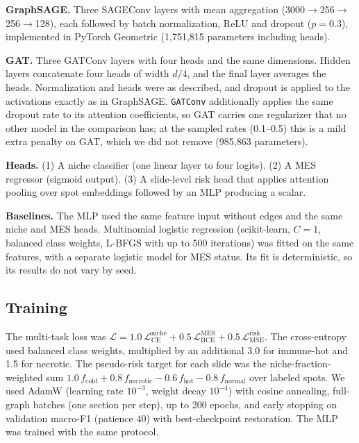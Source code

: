 \documentclass[11pt,letterpaper]{article}
\begin{document}
\textbf{GraphSAGE.} Three SAGEConv layers \cite{hamilton2017} with mean aggregation (3000$\rightarrow$256$\rightarrow$256$\rightarrow$128), each followed by batch normalization, ReLU and dropout ($p = 0.3$), implemented in PyTorch Geometric \cite{fey2019} (1{,}751{,}815 parameters including heads).

\textbf{GAT.} Three GATConv layers \cite{velickovic2018} with four heads and the same dimensions. Hidden layers concatenate four heads of width $d/4$, and the final layer averages the heads. Normalization and heads were as described, and dropout is applied to the activations exactly as in GraphSAGE. \texttt{GATConv} additionally applies the same dropout rate to its attention coefficients, so GAT carries one regularizer that no other model in the comparison has; at the sampled rates (0.1--0.5) this is a mild extra penalty on GAT, which we did not remove (985{,}863 parameters).

\textbf{Heads.} (1) A niche classifier (one linear layer to four logits). (2) A MES regressor (sigmoid output). (3) A slide-level risk head that applies attention pooling over spot embeddings followed by an MLP producing a scalar.

\textbf{Baselines.} The MLP used the same feature input without edges and the same niche and MES heads. Multinomial logistic regression (scikit-learn, $C = 1$, balanced class weights, L-BFGS with up to 500 iterations) was fitted on the same features, with a separate logistic model for MES status. Its fit is deterministic, so its results do not vary by seed.

\subsection{Training}

The multi-task loss was $\mathcal{L} = 1.0\,\mathcal{L}_\mathrm{CE}^\mathrm{niche} + 0.5\,\mathcal{L}_\mathrm{BCE}^\mathrm{MES} + 0.5\,\mathcal{L}_\mathrm{MSE}^\mathrm{risk}$. The cross-entropy used balanced class weights, multiplied by an additional 3.0 for immune-hot and 1.5 for necrotic. The pseudo-risk target for each slide was the niche-fraction-weighted sum $1.0\,f_\mathrm{cold} + 0.8\,f_\mathrm{necrotic} - 0.6\,f_\mathrm{hot} - 0.8\,f_\mathrm{normal}$ over labeled spots. We used AdamW (learning rate $10^{-3}$, weight decay $10^{-4}$) with cosine annealing, full-graph batches (one section per step), up to 200 epochs, and early stopping on validation macro-F1 (patience 40) with best-checkpoint restoration. The MLP was trained with the same protocol.
\end{document}
